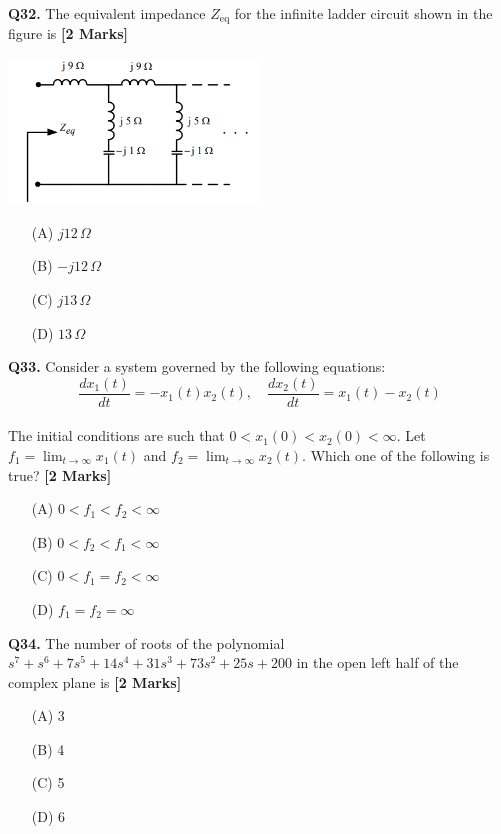 \documentclass[11pt]{article}
\newcommand{\questionb}[2]{
    \noindent\textbf{Q#2.} #1 \hfill \textbf{[2 Marks]}
}
\begin{document}
\questionb{The equivalent impedance \( Z_{\text{eq}} \) for the infinite ladder circuit shown in the figure is}{32}
\begin{center}
\includegraphics[width=0.5\textwidth]{figures/32.png}
\end{center}
\begin{enumerate}
    \item[(A)] \( j12 \, \Omega \)
    \item[(B)] \( -j12 \, \Omega \)
    \item[(C)] \( j13 \, \Omega \)
    \item[(D)] \( 13 \, \Omega \)
\end{enumerate}
\vspace{0.5cm}

\questionb{Consider a system governed by the following equations: \\
\[
\frac{dx_1(t)}{dt} = -x_1(t)x_2(t), \quad \frac{dx_2(t)}{dt} = x_1(t) - x_2(t)
\] \\
The initial conditions are such that \( 0 < x_1(0) < x_2(0) < \infty \). Let \( f_1 = \lim_{t \to \infty} x_1(t) \) and \( f_2 = \lim_{t \to \infty} x_2(t) \). Which one of the following is true?}{33}
\begin{enumerate}
    \item[(A)] \( 0 < f_1 < f_2 < \infty \)
    \item[(B)] \( 0 < f_2 < f_1 < \infty \)
    \item[(C)] \( 0 < f_1 = f_2 < \infty \)
    \item[(D)] \( f_1 = f_2 = \infty \)
\end{enumerate}
\vspace{0.5cm}

\questionb{The number of roots of the polynomial \( s^7 + s^6 + 7s^5 + 14s^4 + 31s^3 + 73s^2 + 25s + 200 \) in the open left half of the complex plane is}{34}
\begin{enumerate}
    \item[(A)] 3
    \item[(B)] 4
    \item[(C)] 5
    \item[(D)] 6
\end{enumerate}
\vspace{0.5cm}
\end{document}

